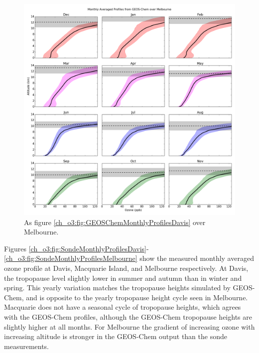     \begin{figure}[!htbp]
      \includegraphics[width=\textwidth]{Figures/Ozone/Melbourne_GC_monthprofiles.png}
      \caption{As figure \ref{ch_o3:fig:GEOSChemMonthlyProfilesDavis} over Melbourne.}
      \label{ch_o3:fig:GEOSChemMonthlyProfilesMelbourne}
    \end{figure}
    
    Figures \ref{ch_o3:fig:SondeMonthlyProfilesDavis}-\ref{ch_o3:fig:SondeMonthlyProfilesMelbourne} show the measured monthly averaged ozone profile at Davis, Macquarie Island, and Melbourne respectively.
    At Davis, the tropopause level slightly lower in summer and autumn than in winter and spring.
    This yearly variation matches the tropopause heights simulated by GEOS-Chem, and is opposite to the yearly tropopause height cycle seen in Melbourne.
    Macquarie does not have a seasonal cycle of tropopause heights, which agrees with the GEOS-Chem profiles, although the GEOS-Chem tropopause heights are slightly higher at all months.
    For Melbourne the gradient of increasing ozone with increasing altitude is stronger in the GEOS-Chem output than the sonde measurements.
    
